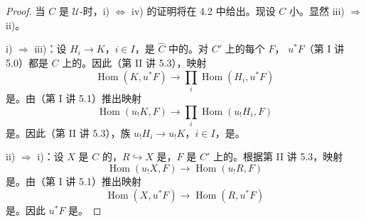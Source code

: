 \begin{proof}
当 $C$ 是 $\mathcal U$-时，i) $\Leftrightarrow$ iv) 的证明将在 4.2 中给出。现设 $C$ 小。显然 iii) $\Rightarrow$ ii)。

\noindent i) $\Rightarrow$ iii)：设 $H_i\to K$，$i\in I$，是 $\widehat C$ 中的。对 $C'$ 上的每个 $F$， $u^*F$（第 I 讲 5.0）都是 $C$ 上的。因此（第 II 讲 5.3），映射
\[
 \operatorname{Hom}(K,u^*F)\longrightarrow\prod_i\operatorname{Hom}(H_i,u^*F)
\]
是。由（第 I 讲 5.1）推出映射
\[
 \operatorname{Hom}(u_!K,F)\longrightarrow\prod_i\operatorname{Hom}(u_!H_i,F)
\]
是。因此（第 II 讲 5.3），族 $u_!H_i\to u_!K$，$i\in I$，是。

\noindent ii) $\Rightarrow$ i)：设 $X$ 是 $C$ 的，$R\hookrightarrow X$ 是，$F$ 是 $C'$ 上的。根据第 II 讲 5.3，映射
\[
 \operatorname{Hom}(u_!X,F)\longrightarrow\operatorname{Hom}(u_!R,F)
\]
是。由（第 I 讲 5.1）推出映射
\[
 \operatorname{Hom}(X,u^*F)\longrightarrow\operatorname{Hom}(R,u^*F)
\]
是。因此 $u^*F$ 是。


\end{proof}
